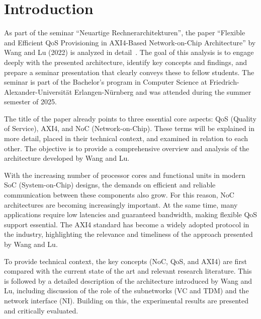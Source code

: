\chapter{Introduction}

As part of the seminar “Neuartige Rechnerarchitekturen”, the paper “Flexible and Efficient QoS Provisioning in AXI4-Based Network-on-Chip Architecture” by Wang and Lu (2022) is analyzed in detail~\cite{wang_flexible_2022}. The goal of this analysis is to engage deeply with the presented architecture, identify key concepts and findings, and prepare a seminar presentation that clearly conveys these to fellow students.
The seminar is part of the Bachelor's program in Computer Science at Friedrich-Alexander-Universität Erlangen-Nürnberg and was attended during the summer semester of 2025.

The title of the paper already points to three essential core aspects: QoS (Quality of Service), AXI4, and NoC (Network-on-Chip). These terms will be explained in more detail, placed in their technical context, and examined in relation to each other. The objective is to provide a comprehensive overview and analysis of the architecture developed by Wang and Lu.

With the increasing number of processor cores and functional units in modern SoC (System-on-Chip) designs, the demands on efficient and reliable communication between these components also grow. For this reason, NoC architectures are becoming increasingly important. At the same time, many applications require low latencies and guaranteed bandwidth, making flexible QoS support essential. The AXI4 standard has become a widely adopted protocol in the industry, highlighting the relevance and timeliness of the approach presented by Wang and Lu.

To provide technical context, the key concepts (NoC, QoS, and AXI4) are first compared with the current state of the art and relevant research literature. This is followed by a detailed description of the architecture introduced by Wang and Lu, including discussion of the role of the subnetworks (VC and TDM) and the network interface (NI). Building on this, the experimental results are presented and critically evaluated.
